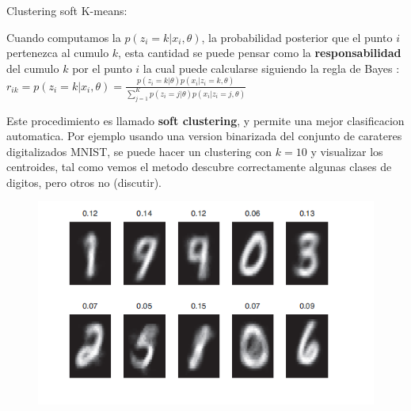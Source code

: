 \documentclass[ignorenonframetext,]{beamer}
\begin{document}
\begin{frame}{Clustering soft K-means:}

Cuando computamos la \(p(z_{i} = k|x_{i}, \theta)\), la probabilidad
posterior que el punto \(i\) pertenezca al cumulo \(k\), esta cantidad
se puede pensar como la \textbf{responsabilidad} del cumulo \(k\) por el
punto \(i\) la cual puede calcularse siguiendo la regla de Bayes :
\(r_{ik}=p(z_{i}=k|x_{i}, \theta)=\frac{p(z_{i}=k|\theta )p(x_{i}|z_{i}=k, \theta)}{\sum_{j=1}^{K} p(z_{i}=j|\theta)p(x_{i}|z_{i}=j, \theta)}\)

Este procedimiento es llamado \textbf{soft clustering}, y permite una
mejor clasificacion automatica. Por ejemplo usando una version
binarizada del conjunto de carateres digitalizados MNIST, se puede hacer
un clustering con \(k=10\) y visualizar los centroides, tal como vemos
el metodo descubre correctamente algunas clases de digitos, pero otros
no (discutir).

\begin{figure}
\centering
\includegraphics{./handw.png}
\caption{}
\end{figure}

\end{frame}
\end{document}
